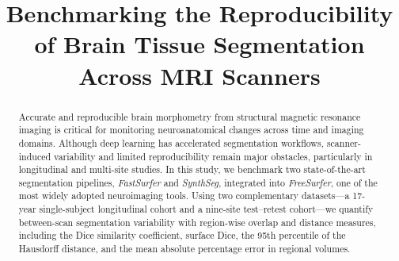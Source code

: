\documentclass{midl} %
\title[Benchmarking Brain Tissue Segmentation Across MRI Scanners]{Benchmarking the Reproducibility of Brain Tissue Segmentation Across MRI Scanners}
\begin{document}
\maketitle

\begin{abstract}
  



Accurate and reproducible brain morphometry from structural magnetic resonance imaging is critical for monitoring neuroanatomical changes across time and imaging domains. Although deep learning has accelerated segmentation workflows, scanner-induced variability and limited reproducibility remain major obstacles, particularly in longitudinal and multi-site studies. In this study, we benchmark two state-of-the-art segmentation pipelines, \textit{FastSurfer} and \textit{SynthSeg}, integrated into \textit{FreeSurfer}, one of the most widely adopted neuroimaging tools. Using two complementary datasets---a 17-year single-subject longitudinal cohort and a nine-site test--retest cohort---we quantify between-scan segmentation variability with region-wise overlap and distance measures, including the Dice similarity coefficient, surface Dice, the 95th percentile of the Hausdorff distance, and the mean absolute percentage error in regional volumes.


\end{abstract}
\end{document}
